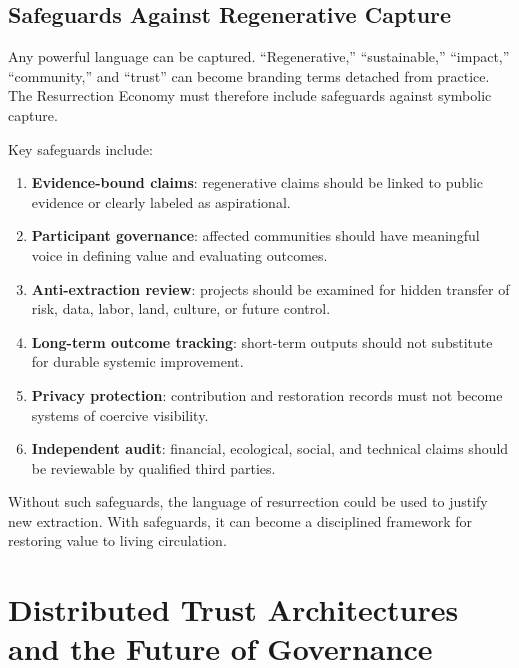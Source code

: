\documentclass[12pt]{article}
\begin{document}
\subsection{Safeguards Against Regenerative Capture}

Any powerful language can be captured. ``Regenerative,'' ``sustainable,'' ``impact,'' ``community,'' and ``trust'' can become branding terms detached from practice. The Resurrection Economy must therefore include safeguards against symbolic capture.

Key safeguards include:

\begin{enumerate}
  \item \textbf{Evidence-bound claims}: regenerative claims should be linked to public evidence or clearly labeled as aspirational.
  \item \textbf{Participant governance}: affected communities should have meaningful voice in defining value and evaluating outcomes.
  \item \textbf{Anti-extraction review}: projects should be examined for hidden transfer of risk, data, labor, land, culture, or future control.
  \item \textbf{Long-term outcome tracking}: short-term outputs should not substitute for durable systemic improvement.
  \item \textbf{Privacy protection}: contribution and restoration records must not become systems of coercive visibility.
  \item \textbf{Independent audit}: financial, ecological, social, and technical claims should be reviewable by qualified third parties.
\end{enumerate}

Without such safeguards, the language of resurrection could be used to justify new extraction. With safeguards, it can become a disciplined framework for restoring value to living circulation.


\section{Distributed Trust Architectures and the Future of Governance}
\end{document}
